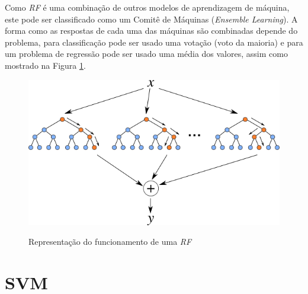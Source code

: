 Como \textit{\acrshort{RF}} é uma combinação de outros modelos de aprendizagem de máquina, este pode ser classificado como um Comitê de Máquinas (\textit{Ensemble Learning}). A forma como as respostas de cada uma das máquinas são combinadas depende do problema, para classificação pode ser usado uma votação (voto da maioria) e para um problema de regressão pode ser usado uma média dos valores, assim como mostrado na Figura \ref{figure:rf}.

\begin{figure}[h]
    \centering
    \includegraphics[scale=0.8]{monography/img/random_forest.png}
    \label{figure:rf}
    \caption{Representação do funcionamento de uma \textit{\acrshort{RF}}\footnotemark}
\end{figure}



\section{\acrfull{SVM}}


